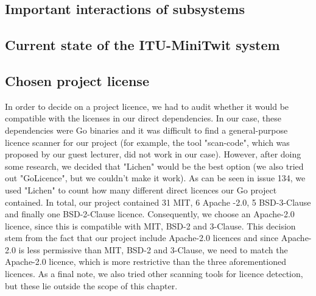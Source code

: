 \subsection{Important interactions of subsystems}


\subsection{Current state of the ITU-MiniTwit system}


\subsection{Chosen project license}
In order to decide on a project licence, we had to audit whether it would be compatible with the licenses in our direct dependencies. In our case, these dependencies were Go binaries and it was difficult to find a general-purpose licence scanner for our project (for example, the tool "scan-code", which was proposed by our guest lecturer, did not work in our case). However, after doing some research, we decided that "Lichen" would be the best option (we also tried out "GoLicence", but we couldn't make it work). As can be seen in issue 134\cite{issue134}, we used "Lichen" to count how many different direct licences our Go project contained. In total, our project contained 31 MIT, 6 Apache -2.0, 5 BSD-3-Clause and finally one BSD-2-Clause licence. Consequently, we choose an Apache-2.0 licence, since this is compatible with MIT, BSD-2 and 3-Clause. This decision stem from the fact that our project include Apache-2.0 licences and since Apache-2.0 is less permissive than MIT, BSD-2 and 3-Clause, we need to match the Apache-2.0 licence, which is more restrictive than the three aforementioned licences. As a final note, we also tried other scanning tools for licence detection, but these lie outside the scope of this chapter.


